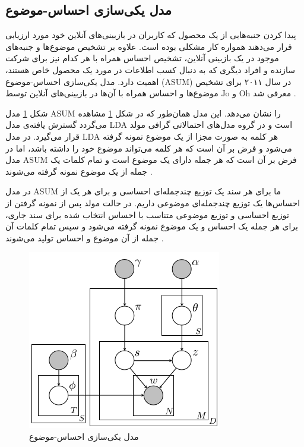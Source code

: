 	\subsection{مدل یکی‌سازی احساس-موضوع}
	\label{chap3sec4sub2}
	
	پیدا کردن جنبه‌هایی از یک محصول که کاربران در بازبینی‌های آنلاین خود مورد ارزیابی قرار می‌‌دهند همواره کار مشکلی‌ بوده است. علاوه بر تشخیص موضوع‌ها و جنبه‌های موجود در یک بازبینی آنلاین، تشخیص احساس همراه با هر کدام نیز برای شرکت سازنده و افراد دیگری که به دنبال کسب اطلاعات در مورد یک محصول خاص هستند، اهمیت دارد. مدل یکی‌سازی احساس-موضوع
	(ASUM)
	در سال ۲۰۱۱ برای تشخیص موضوع‌ها و احساس همراه با آن‌ها در بازبینی‌های آنلاین توسط
	Jo
	و
	Oh
	معرفی‌ شد
	\cite{jo2011aspect}.
	
	شکل
	\ref{chap3-fig9}
	مدل
	ASUM
	را نشان می‌‌دهد. این مدل همان‌طور که در شکل
	\ref{chap3-fig9}
	مشاهده می‌‌گردد گسترش یافته‌ی مدل
	LDA
	است
	\cite{jo2011aspect}
	و در گروه مدل‌های احتمالاتی گرافی‌ مولد قرار می‌‌گیرد. در مدل
	LDA
	هر کلمه به صورت مجزا از یک موضوع نمونه گرفته می‌‌شود و فرض بر آن است که هر کلمه می‌‌تواند موضوع خود را داشته باشد، اما در مدل
	ASUM
	فرض بر آن است که هر جمله دارای یک موضوع است و تمام کلمات یک جمله از یک موضوع نمونه گرفته می‌‌شوند
	\cite{jo2011aspect}.
	
در مدل
ASUM
ما برای هر سند یک توزیع چندجمله‌ای احساسی‌ و برای هر یک از احساس‌ها یک توزیع چندجمله‌ای موضوعی داریم. در حالت مولد پس از نمونه گرفتن از توزیع احساسی‌ و توزیع موضوعی متناسب با احساس انتخاب شده برای سند جاری، برای هر جمله یک احساس و یک موضوع نمونه گرفته ‌می‌‌شود و سپس تمام کلمات آن جمله از آن موضوع و احساس تولید می‌‌شوند
\cite{jo2011aspect}.

\begin{figure}[!t]
	\centering
	\includegraphics[scale=0.5]{chap3-img/ASUM}
	\caption{مدل یکی‌سازی احساس-موضوع \cite{jo2011aspect}}
	\label{chap3-fig9}
\end{figure}


